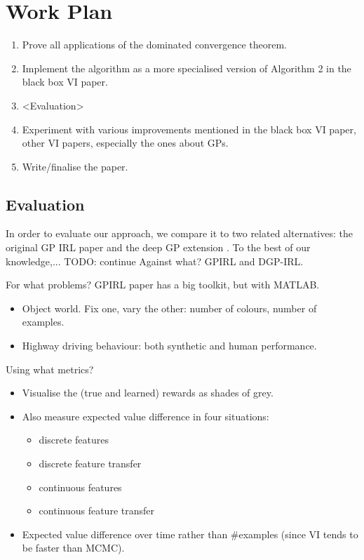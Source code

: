 \documentclass{mprop}
\theoremstyle{definition}
\begin{document}
\section{Work Plan}

\begin{enumerate}
\item Prove all applications of the dominated convergence theorem.
\item Implement the algorithm as a more specialised version of Algorithm 2 in
  the black box VI paper.
\item <Evaluation>
\item Experiment with various improvements mentioned in the black box VI paper,
  other VI papers, especially the ones about GPs.
\item Write/finalise the paper.
\end{enumerate}

\subsection{Evaluation}

In order to evaluate our approach, we compare it to two related alternatives:
the original GP IRL paper \cite{DBLP:conf/nips/LevinePK11} and the deep GP
extension \cite{DBLP:conf/uai/JinDAS17}. To the best of our knowledge,... TODO: continue
Against what? GPIRL and DGP-IRL.

For what problems? GPIRL paper has a big toolkit, but with MATLAB.
\begin{itemize}
\item Object world. Fix one, vary the other: number of colours, number of
  examples.
\item Highway driving behaviour: both synthetic and human performance.
\end{itemize}

Using what metrics?
\begin{itemize}
\item Visualise the (true and learned) rewards as shades of grey.
\item Also measure expected value difference in four situations:
  \begin{itemize}
  \item discrete features
  \item discrete feature transfer
  \item continuous features
  \item continuous feature transfer
  \end{itemize}
\item Expected value difference over time rather than #examples (since VI tends
  to be faster than MCMC).
\end{itemize}
\end{document}
